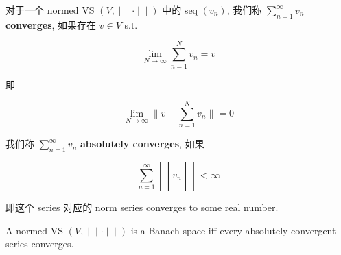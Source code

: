 \begin{definition}{}

对于一个 normed VS \(\left. (V, \middle| \middle| \cdot \middle| \middle| ) \right.\) 中的 seq \((v_{n})\), 我们称 \(\sum_{n = 1}^{\infty}v_{n}\) \textbf{converges}, 如果存在 \(v \in V\) s.t.

\[\lim\limits_{N\rightarrow\infty}\sum\limits_{n = 1}^{N}v_{n} = v\]

即

\[\lim\limits_{N\rightarrow\infty} \parallel v - \sum\limits_{n = 1}^{N}v_{n} \parallel = 0\]

我们称 \(\sum_{n = 1}^{\infty}v_{n}\) \textbf{absolutely converges}, 如果

\[\left. \sum\limits_{n = 1}^{\infty} \middle| \middle| v_{n} \middle| \middle| < \infty \right.\]

即这个 series 对应的 norm series converges to some real number.

\end{definition}

\begin{theorem}{}\label{thm-09-l-p-space-and-inequalities-another-criterion-for-banach-space}

A normed VS \(\left. (V, \middle| \middle| \cdot \middle| \middle| ) \right.\) is a Banach space iff every absolutely convergent series converges.

\end{theorem}


